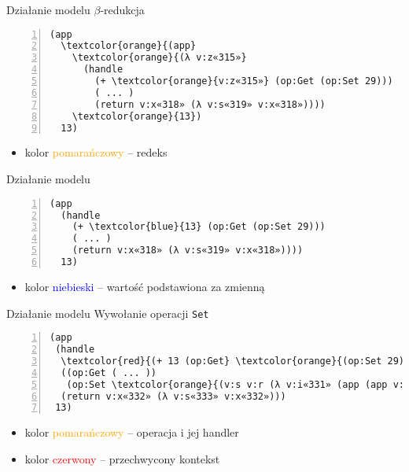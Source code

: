 \documentclass{beamer}
\begin{document}
\begin{frame}[fragile]{Działanie modelu}
$\beta$-redukcja
\begin{Verbatim}[commandchars=\\\{\},numbers=left]
(app
  \textcolor{orange}{(app}
    \textcolor{orange}{(λ v:z«315»}
      (handle
        (+ \textcolor{orange}{v:z«315»} (op:Get (op:Set 29)))
        ( ... )
        (return v:x«318» (λ v:s«319» v:x«318»))))
    \textcolor{orange}{13})
  13)
\end{Verbatim}
\begin{itemize}
  \item kolor \textcolor{orange}{pomarańczowy} -- redeks
\end{itemize}
\end{frame}

\begin{frame}[fragile]{Działanie modelu}
\begin{Verbatim}[commandchars=\\\{\},numbers=left]
(app
  (handle
    (+ \textcolor{blue}{13} (op:Get (op:Set 29)))
    ( ... )
    (return v:x«318» (λ v:s«319» v:x«318»))))
  13)
\end{Verbatim}
\begin{itemize}
  \item kolor \textcolor{blue}{niebieski} -- wartość podstawiona za zmienną
\end{itemize}
\end{frame}

\begin{frame}[fragile]{Działanie modelu}
Wywołanie operacji \texttt{Set}
\begin{Verbatim}[commandchars=\\\{\},numbers=left]
(app
 (handle
  \textcolor{red}{(+ 13 (op:Get} \textcolor{orange}{(op:Set 29)}\textcolor{red}{))}
  ((op:Get ( ... ))
   (op:Set \textcolor{orange}{(v:s v:r (λ v:i«331» (app (app v:r 0) v:s)))}))
  (return v:x«332» (λ v:s«333» v:x«332»)))
 13)
\end{Verbatim}
\begin{itemize}
  \item kolor \textcolor{orange}{pomarańczowy} -- operacja i jej handler
  \item kolor \textcolor{red}{czerwony} -- przechwycony kontekst
\end{itemize}
\end{frame}
\end{document}
